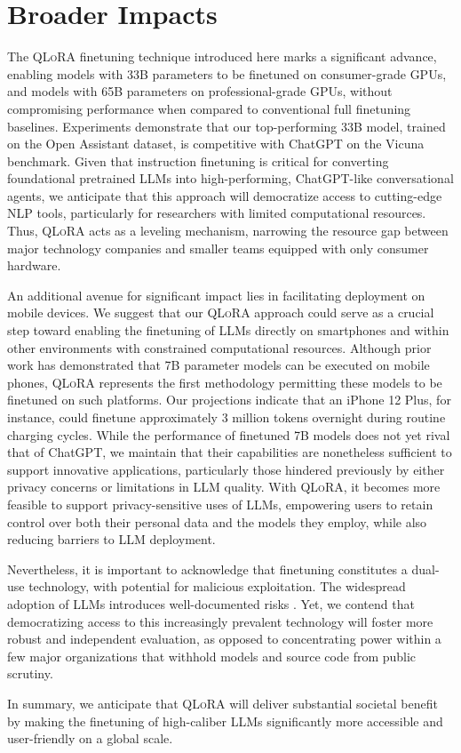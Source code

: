 \section{Broader Impacts}

The \textsc{QLoRA} finetuning technique introduced here marks a significant advance, enabling models with 33B parameters to be finetuned on consumer-grade GPUs, and models with 65B parameters on professional-grade GPUs, without compromising performance when compared to conventional full finetuning baselines. Experiments demonstrate that our top-performing 33B model, trained on the Open Assistant dataset, is competitive with ChatGPT on the Vicuna benchmark. Given that instruction finetuning is critical for converting foundational pretrained LLMs into high-performing, ChatGPT-like conversational agents, we anticipate that this approach will democratize access to cutting-edge NLP tools, particularly for researchers with limited computational resources. Thus, \textsc{QLoRA} acts as a leveling mechanism, narrowing the resource gap between major technology companies and smaller teams equipped with only consumer hardware.

An additional avenue for significant impact lies in facilitating deployment on mobile devices. We suggest that our \textsc{QLoRA} approach could serve as a crucial step toward enabling the finetuning of LLMs directly on smartphones and within other environments with constrained computational resources. Although prior work has demonstrated that 7B parameter models can be executed on mobile phones, \textsc{QLoRA} represents the first methodology permitting these models to be finetuned on such platforms. Our projections indicate that an iPhone 12 Plus, for instance, could finetune approximately 3 million tokens overnight during routine charging cycles. While the performance of finetuned 7B models does not yet rival that of ChatGPT, we maintain that their capabilities are nonetheless sufficient to support innovative applications, particularly those hindered previously by either privacy concerns or limitations in LLM quality. With \textsc{QLoRA}, it becomes more feasible to support privacy-sensitive uses of LLMs, empowering users to retain control over both their personal data and the models they employ, while also reducing barriers to LLM deployment.

Nevertheless, it is important to acknowledge that finetuning constitutes a dual-use technology, with potential for malicious exploitation. The widespread adoption of LLMs introduces well-documented risks \citep{bommasani2021opportunities,bender2021dangers}. Yet, we contend that democratizing access to this increasingly prevalent technology will foster more robust and independent evaluation, as opposed to concentrating power within a few major organizations that withhold models and source code from public scrutiny.

In summary, we anticipate that \textsc{QLoRA} will deliver substantial societal benefit by making the finetuning of high-caliber LLMs significantly more accessible and user-friendly on a global scale.